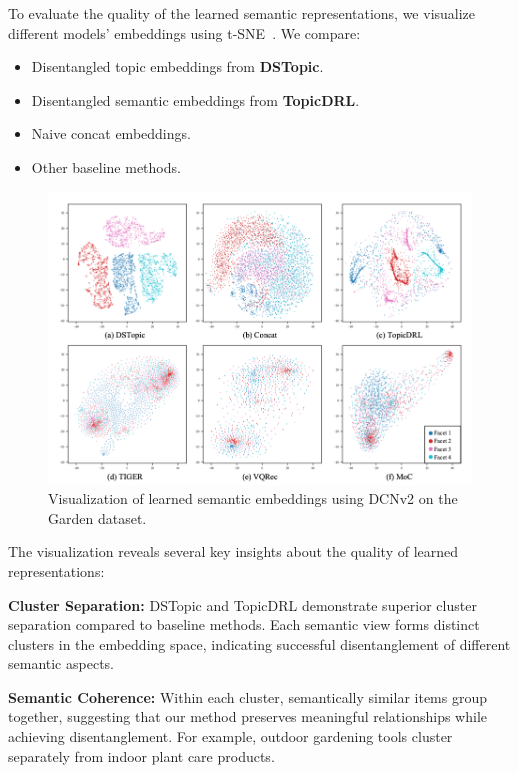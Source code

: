 To evaluate the quality of the learned semantic representations, we visualize different models' embeddings using t-SNE~\cite{van2008visualizing}. We compare:
\begin{itemize}
    \item Disentangled topic embeddings from \textbf{DSTopic}.
    \item Disentangled semantic embeddings from \textbf{TopicDRL}.
    \item Naive concat embeddings.
    \item Other baseline methods.
\end{itemize}

\begin{figure}[htbp]
    \centering
    \includegraphics[width=\textwidth]{Figures/Chapter5/fig3.png}
    \caption{Visualization of learned semantic embeddings using DCNv2 on the Garden dataset.}
    \label{fig:tsne}
\end{figure}

The visualization reveals several key insights about the quality of learned representations:

\textbf{Cluster Separation:} DSTopic and TopicDRL demonstrate superior cluster separation compared to baseline methods. Each semantic view forms distinct clusters in the embedding space, indicating successful disentanglement of different semantic aspects.

\textbf{Semantic Coherence:} Within each cluster, semantically similar items group together, suggesting that our method preserves meaningful relationships while achieving disentanglement. For example, outdoor gardening tools cluster separately from indoor plant care products.

